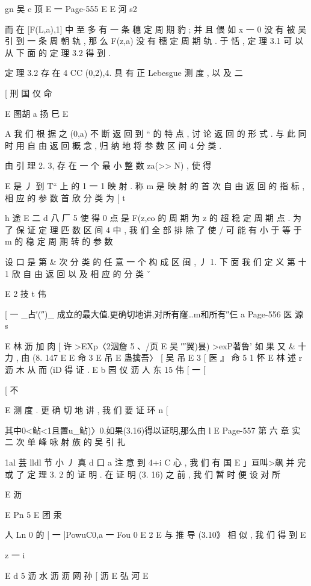 {{gn 吴 c 顶
E 一
Page-555
E E 河 s2

而 在 [F(L,a),1] 中 至 多 有 一 条 穗 定 周 期 豹 ; 并 且 偎 如 x 一 0 没 有
被 吴 引 到 一 条 周 朝 轨 , 那 么 F(z,a) 没 有 穗 定 周 期 轨 . 于 恬 , 定 理
3.1 可 以 从 下 面 的 定 理 3.2 得 到 .

定 理 3.2 存 在 4 CC (0,2),4. 具 有 正 Lebesgue 测 度 , 以 及
二

[ 刑 国 仪 命

E 图胡 a 扬 巳
E

A 我 们 根 据 之 (0,a) 不 断 返 回 到 “ 的 特 点 , 讨 论 返 回 的 形 式 .
与 此 同 时 用 自 由 返 回 概 念 , 归 纳 地 将 参 数 区 间 4 分 类 .

由 引 理 2. 3, 存 在 一 个 最 小 整 数 za(>> N) , 使 得

E
是 丿 到 T“ 上 的 1 一 1 映 射 . 称 m 是 映 射 的 首 次 自 由 返 回 的 指 标 ,
相 应 的 参 数 首 欣 分 类 为
[ t

h 途
E 二 d 八 厂 5
使 得 0 点 是 F(z,eo 的 周 期 为 z 的 超 稳 定 周 期 点 . 为 了 保 证 定 理
匹
数 区 间 4 中 , 我 们 全 部 排 除 了 使 / 可 能 有 小 于 等 于 m 的 稳 定 周
期 转 的 参 数

设 口 是 第 & 次 分 类 的 任 意 一 个 构 成 区 闽 , 丿 1. 下 面 我 们 定 义
第 十 1 欣 自 由 返 回 以 及 相 应 的 分 类 ˇ

E 2 技
t 伟

[ 一 _占′(″)_
成立的最大值.更确切地讲,对所有窿…m和所有″仨 a
Page-556
医 源 s

E 林 沥 加 肉
[ 许
>EXp〈2泅詹 5 、/页 E 吴 ′″翼)昙) >exP著鲁'
如 果 又 & 十 力 , 由 (8. 147
E
E 命 3 E 吊
E 蛊擒吾〉 [ 吴 吊
E
3
[
医
』 命 5 1 怀
E 林 述 r 沥 木
从 而 (iD 得 证 .
E
b 园 仪 沥 人 东 15
伟
[ 一
[

[ 不

E
测 度 . 更 确 切 地 讲 , 我 们 要 证 环
n [

其中0<鲇<1且置u_鲇)〉0.如果(3.16)得以证明,那么由
l
E
Page-557
第 六 章 实 二 次 单 峰 咏 射 族 的 吴 引 扎

1al 芸 lldl 节 小 丿 真 d 口 a
注 意 到 4+i C 心 , 我 们 有 国
E 」亘叫>飙
并 完 或 了 定 理 3. 2 的 证 明 . 在 证 明 (3. 16) 之 前 , 我 们 暂 时 便 设 对 所

E 沥

E
Pn 5
E 团 汞

人
Ln 0 的 | 一 |PowuC0,a 一 Fou 0
E 2
E
与 推 导 (3.10》 相 似 , 我 们 得 到
E

z 一
i

E d
5 沥 水 沥 沥 网 孙
[ 沥 E 弘
河
E

}}
